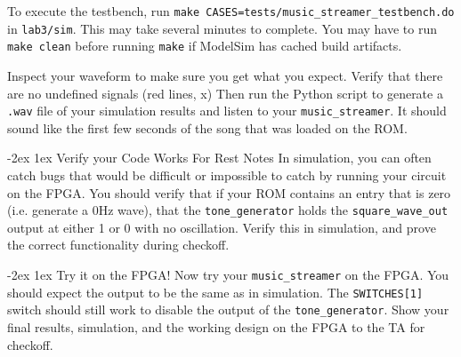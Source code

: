 \documentclass[11pt]{article}
\makeatletter
\renewcommand{\section}
{\@startsection {section}{1}{0pt}
 {-2ex}
 {1ex}
 {\bfseries\Large}}
\makeatother
\begin{document}
To execute the testbench, run \verb|make CASES=tests/music_streamer_testbench.do| in \verb|lab3/sim|. This may take several minutes to complete. You may have to run \verb|make clean| before running \verb|make| if ModelSim has cached build artifacts.

Inspect your waveform to make sure you get what you expect. Verify that there are no undefined signals (red lines, x) Then run the Python script to generate a \verb|.wav| file of your simulation results and listen to your \verb|music_streamer|. It should sound like the first few seconds of the song that was loaded on the ROM.

\section{Verify your Code Works For Rest Notes}
In simulation, you can often catch bugs that would be difficult or impossible to catch by running your circuit on the FPGA. You should verify that if your ROM contains an entry that is zero (i.e. generate a 0Hz wave), that the \verb|tone_generator| holds the \verb|square_wave_out| output at either 1 or 0 with no oscillation. Verify this in simulation, and prove the correct functionality during checkoff.

\section{Try it on the FPGA!}
Now try your \verb|music_streamer| on the FPGA. You should expect the output to be the same as in simulation. The \verb|SWITCHES[1]| switch should still work to disable the output of the \verb|tone_generator|. Show your final results, simulation, and the working design on the FPGA to the TA for checkoff.


\end{document}
